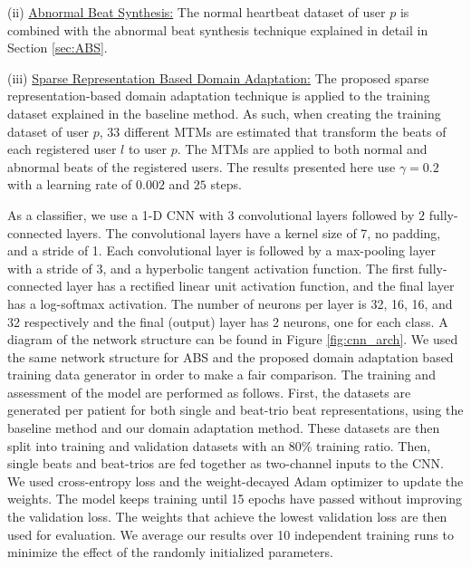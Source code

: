 \documentclass[journal,transmag]{IEEEtran}
\begin{document}
(ii) \underline{Abnormal Beat Synthesis:} The normal heartbeat dataset of user $p$ is combined with the abnormal beat synthesis technique explained in detail in Section \ref{sec:ABS}.

(iii) \underline{Sparse Representation Based Domain Adaptation:} The proposed sparse representation-based domain adaptation technique is applied to the training dataset explained in the baseline method. As such, when creating the training dataset of user $p$, 33 different MTMs are estimated that transform the beats of each registered user $l$ to user $p$. The MTMs are applied to both normal and abnormal beats of the registered users. The results presented here use $\gamma = 0.2$ with a learning rate of $0.002$ and $25$ steps.

As a classifier, we use a 1-D CNN with $3$ convolutional layers followed by $2$ fully-connected layers. The convolutional layers have a kernel size of 7, no padding, and a stride of 1. Each convolutional layer is followed by a max-pooling layer with a stride of 3, and a hyperbolic tangent activation function. The first fully-connected layer has a rectified linear unit activation function, and the final layer has a log-softmax activation. The number of neurons per layer is 32, 16, 16, and 32 respectively and the final (output) layer has 2 neurons, one for each class. A diagram of the network structure can be found in Figure \ref{fig:cnn_arch}. We used the same network structure for ABS and the proposed domain adaptation based training data generator in order to make a fair comparison. The training and assessment of the model are performed as follows. First, the datasets are generated per patient for both single and beat-trio beat representations, using the baseline method and our domain adaptation method. These datasets are then split into training and validation datasets with an 80\% training ratio. Then, single beats and beat-trios are fed together as two-channel inputs to the CNN. We used cross-entropy loss and the weight-decayed Adam optimizer \cite{adamW} to update the weights. The model keeps training until 15 epochs have passed without improving the validation loss. The weights that achieve the lowest validation loss are then used for evaluation. We average our results over 10 independent training runs to minimize the effect of the randomly initialized parameters.
\end{document}
